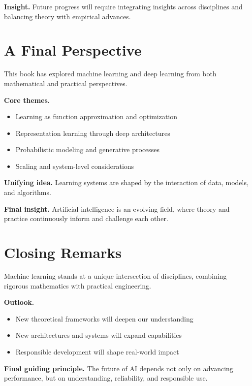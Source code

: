 \medskip

\noindent
\textbf{Insight.}  
Future progress will require integrating insights across disciplines and balancing theory with empirical advances.

\section{A Final Perspective}

This book has explored machine learning and deep learning from both mathematical and practical perspectives.

\medskip

\noindent
\textbf{Core themes.}
\begin{itemize}
    \item Learning as function approximation and optimization
    \item Representation learning through deep architectures
    \item Probabilistic modeling and generative processes
    \item Scaling and system-level considerations
\end{itemize}

\medskip

\noindent
\textbf{Unifying idea.}  
Learning systems are shaped by the interaction of data, models, and algorithms.

\medskip

\noindent
\textbf{Final insight.}  
Artificial intelligence is an evolving field, where theory and practice continuously inform and challenge each other.

\section{Closing Remarks}

Machine learning stands at a unique intersection of disciplines, combining rigorous mathematics with practical engineering.

\medskip

\noindent
\textbf{Outlook.}
\begin{itemize}
    \item New theoretical frameworks will deepen our understanding
    \item New architectures and systems will expand capabilities
    \item Responsible development will shape real-world impact
\end{itemize}

\medskip

\noindent
\textbf{Final guiding principle.}  
The future of AI depends not only on advancing performance, but on understanding, reliability, and responsible use.